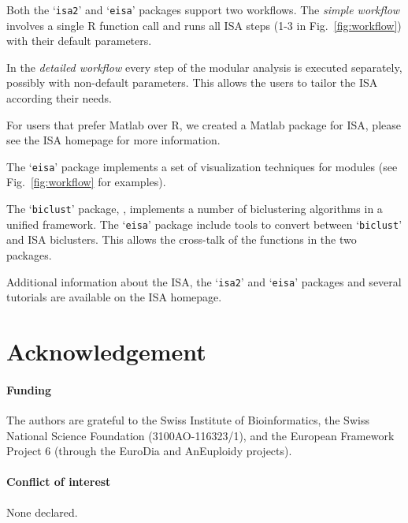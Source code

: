 \documentclass{bioinfo}
\newcommand{\Rpackage}[1]{`\texttt{#1}'}
\begin{document}
Both the \Rpackage{isa2} and \Rpackage{eisa} packages support two
workflows. The \emph{simple workflow} involves a single R function
call and runs all ISA steps (1-3 in Fig.~\ref{fig:workflow}) with
their default parameters.

In the \emph{detailed workflow} every step of the modular analysis 
is executed separately, possibly with non-default parameters. This allows
the users to tailor the ISA according their needs.

For users that prefer Matlab over R, we created a Matlab package for
ISA, please see the ISA homepage for more information.


The \Rpackage{eisa} package implements a set of visualization
techniques for modules (see Fig.~\ref{fig:workflow} for examples).

The \Rpackage{biclust} package, \citep{biclust}, implements a number of
biclustering algorithms in a unified framework. The \Rpackage{eisa}
package include tools to convert between \Rpackage{biclust} and ISA
biclusters. This allows the cross-talk of the functions in the two
packages.

Additional information about the ISA, the \Rpackage{isa2} and
\Rpackage{eisa} packages and several tutorials are available on the
ISA homepage.

\section*{Acknowledgement}

\paragraph{Funding\textcolon} The authors are grateful to the Swiss
Institute of Bioinformatics, the Swiss National Science Foundation
(3100AO-116323/1), and the European Framework Project 6 (through
the EuroDia and AnEuploidy projects).
\paragraph{Conflict of interest\textcolon} None declared.



\end{document}
